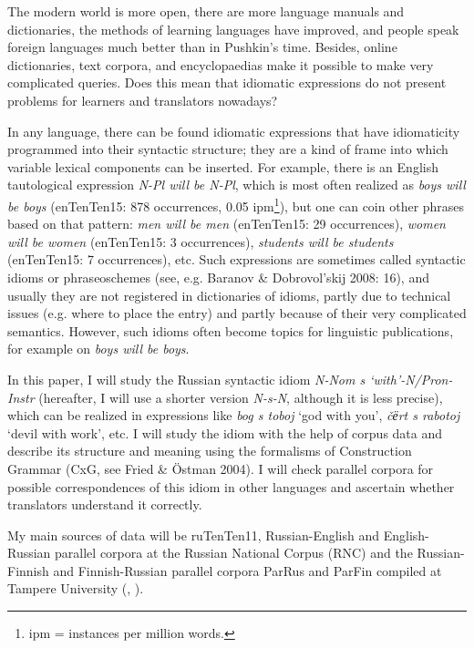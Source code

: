 \documentclass[output=paper]{langscibook}
\begin{document}
The modern world is more open, there are more language manuals and dictionaries, the methods of learning languages have improved, and people speak foreign languages much better than in Pushkin’s time. Besides, online dictionaries, text corpora, and encyclopaedias make it possible to make very complicated queries. Does this mean that idiomatic expressions do not present problems for learners and translators nowadays?

In any language, there can be found idiomatic expressions that have idiomaticity programmed into their syntactic structure; they are a kind of frame into which variable lexical components can be inserted. For example, there is an English tautological expression \textit{N-Pl will be N-Pl}, which is most often realized as \textit{boys will be boys} (enTenTen15: 878 occurrences, 0.05 ipm\footnote{ipm = instances per million words.}), but one can coin other phrases based on that pattern: \textit{men will be men} (enTenTen15: 29 occurrences), \textit{women will be women} (enTenTen15: 3 occurrences), \textit{students will be students} (enTenTen15: 7 occurrences), etc. Such expressions are sometimes called syntactic idioms or phraseoschemes (see, e.g. Baranov \& Dobrovol’skij 2008: 16), and usually they are not registered in dictionaries of idioms, partly due to technical issues (e.g. where to place the entry) and partly because of their very complicated semantics. However, such idioms often become topics for linguistic publications, for example \citealt{Wierzbicka1987} on \textit{boys will be boys}.

In this paper, I will study the Russian syntactic idiom \textit{N-Nom s ‘with’-N/Pron-Instr} (hereafter, I will use a shorter version \textit{N-s-N}, although it is less precise), which can be realized in expressions like \textit{bog s toboj} ‘god with you’, \textit{č{ёrt s rabotoj}} ‘devil with work’, etc. I will study the idiom with the help of corpus data and describe its structure and meaning using the formalisms of Construction Grammar (CxG, see Fried \& Östman 2004). I will check parallel corpora for possible correspondences of this idiom in other languages and ascertain whether translators understand it correctly.

My main sources of data will be ruTenTen11, Russian-English and English-Russian parallel corpora at the Russian National Corpus (RNC) and the Russian-Finnish and Finnish-Russian parallel corpora ParRus and ParFin compiled at Tampere University (\citealt{MikhailovHärme2015}, \citealt{HärmeMikhailov2016}).
\end{document}
